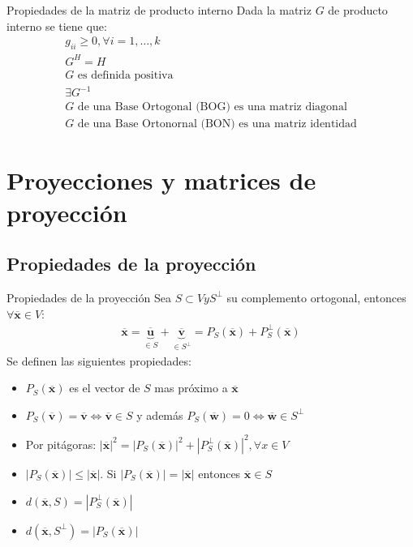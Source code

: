 \documentclass[a4paper, twoside]{article}
\numberwithin{equation}{section}
\numberwithin{figure}{section}
\numberwithin{table}{section}
\newcommand{\vect}[1]{\overline{\textbf{#1}}}
\newcommand{\dete}[1]{\left\vert #1 \right\vert}
\begin{document}
\begin{corolario*}{Propiedades de la matriz de producto interno}
	Dada la matriz $G$ de producto interno se tiene que:
	\begin{align}
		g_{ii} \geq 0, \forall i=1,\ldots,k \\
		G^H=H \\
		G \text{ es definida positiva} \\
		\exists G^{-1} \\
		G \text{ de una Base Ortogonal (BOG) es una matriz diagonal} \\
		G \text{ de una Base Ortonornal (BON) es una matriz identidad}
	\end{align}
\end{corolario*}

\newpage
\section{Proyecciones y matrices de proyección}
\subsection{Propiedades de la proyección}
\begin{definicion*}{Propiedades de la proyección}
	Sea $S \subset V y S^\bot$ su complemento ortogonal, entonces $\forall \vect{x} \in V$:
	\begin{align}
		\vect{x} = \underbrace{ \vect{u} }_{\in S} + \underbrace{ \vect{v} }_{\in S^\bot} = P_S(\vect{x}) + P_S^\bot(\vect{x})
	\end{align}
	Se definen las siguientes propiedades:
	\begin{itemize}
		\item $P_S(\vect{x})$ es el vector de $S$ mas próximo a $\vect{x}$
		\item $P_S(\vect{v}) = \vect{v} \Longleftrightarrow \vect{v} \in S$ y además $P_S(\vect{w}) = 0 \Longleftrightarrow \vect{w} \in S^\bot$
		\item Por pitágoras: $\dete{\vect{x}}^2 = \dete{P_S(\vect{x})}^2 + \dete{P_S^\bot(\vect{x})}^2, \forall x \in V$
		\item $\dete{P_S(\vect{x})} \leq \dete{\vect{x}}$. Si $\dete{P_S(\vect{x})}=\dete{\vect{x}}$ entonces $\vect{x} \in S$
		\item $d(\vect{x},S) = \dete{P_S^\bot(\vect{x})}$
		\item $d(\vect{x},S^\bot) = \dete{P_S(\vect{x})}$
	\end{itemize}
\end{definicion*}
\end{document}

